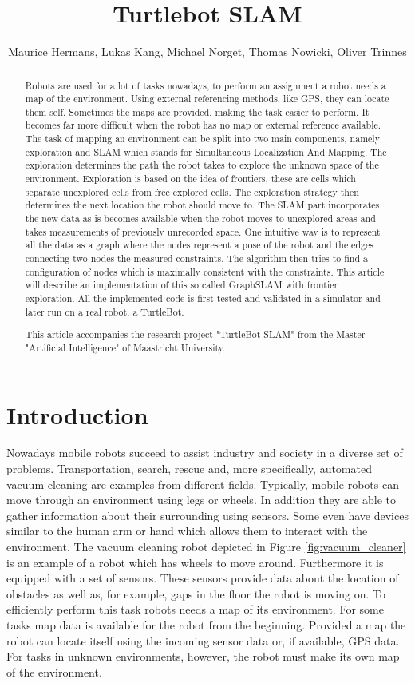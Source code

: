\documentclass{ba-kecs}
\title{Turtlebot SLAM }
\author{Maurice Hermans, Lukas Kang, Michael Norget, Thomas Nowicki, Oliver Trinnes}
\begin{document}
\maketitle

\begin{abstract}
Robots are used for a lot of tasks nowadays, to perform an assignment a robot needs a map of the environment. Using external referencing methods, like GPS, they can locate them self. Sometimes the maps are provided, making the task easier to perform. It becomes far more difficult when the robot has no map or external reference available. The task of mapping an environment can be split into two main components, namely exploration and SLAM which stands for Simultaneous Localization And Mapping. The exploration determines the path the robot takes to explore the unknown space of the environment. Exploration is based on the idea of frontiers, these are cells which separate unexplored cells from free explored cells. The exploration strategy then determines the next location the robot should move to. The SLAM part incorporates the new data as is becomes available when the robot moves to unexplored areas and takes measurements of previously unrecorded space. One intuitive way is to represent all the data as a graph where the nodes represent a pose of the robot and the edges connecting two nodes the measured constraints. The algorithm then tries to find a configuration of nodes which is maximally consistent with the constraints. This article will describe an implementation of this so called GraphSLAM with frontier exploration. All the implemented code is first tested and validated in a simulator and later run on a real robot, a TurtleBot.


This article accompanies the research project "TurtleBot SLAM" from the Master "Artificial Intelligence" of Maastricht University.
\end{abstract}

\section{Introduction}
\label{sec:intro}
Nowadays mobile robots succeed to assist industry and society in a diverse set of problems. Transportation, search, rescue and, more specifically, automated vacuum cleaning are examples from different fields. Typically, mobile robots can move through an environment using legs or wheels. In addition they are able to gather information about their surrounding using sensors. Some even have devices similar to the human arm or hand which allows them to interact with the environment. The vacuum cleaning robot depicted in Figure \ref{fig:vacuum_cleaner} is an example of a robot which has wheels to move around. Furthermore it is equipped with a set of sensors. These sensors provide data about the location of obstacles as well as, for example, gaps in the floor the robot is moving on. To efficiently perform this task robots needs a map of its environment. For some tasks map data is available for the robot from the beginning. Provided a map the robot can locate itself using the incoming sensor data or, if available, GPS data. For tasks in unknown environments, however, the robot must make its own map of the environment.
\end{document}
